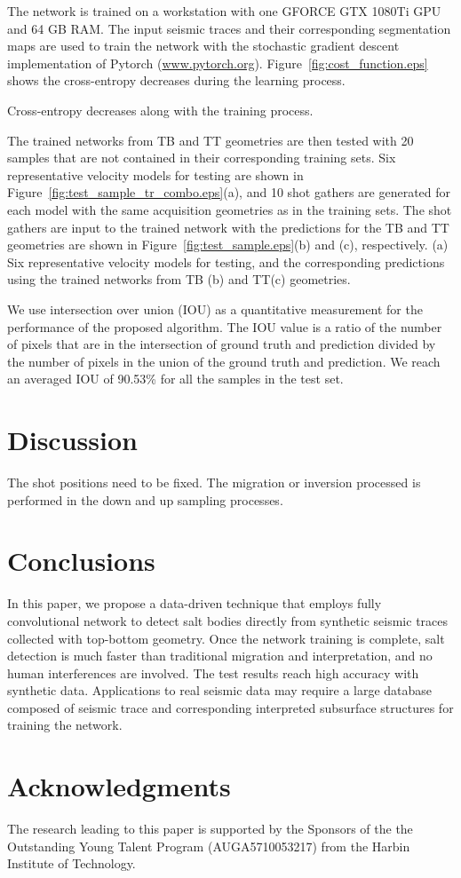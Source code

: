 \documentclass{segabs}
\begin{document}
The network is trained on a workstation with one GFORCE GTX 1080Ti GPU and 64 GB RAM. The input seismic traces and their corresponding segmentation maps are used to train the network with the stochastic gradient descent implementation of Pytorch (\url{www.pytorch.org}). Figure~\ref{fig:cost_function.eps} shows the cross-entropy decreases during the learning process.

{Cross-entropy decreases along with the training process.}

The trained networks from TB and TT geometries are then tested with 20 samples that are not contained in their corresponding training sets. Six representative velocity models for testing are shown in Figure~\ref{fig:test_sample_tr_combo.eps}(a), and 10 shot gathers are generated for each model with the same acquisition geometries as in the training sets. The shot gathers are input to the trained network with the predictions for the TB and TT geometries are shown in Figure~\ref{fig:test_sample.eps}(b) and (c), respectively.
{(a) Six representative velocity models for testing, and the corresponding predictions using the trained networks from TB (b) and TT(c) geometries.}

We use intersection over union (IOU) as a quantitative measurement for the performance of the proposed algorithm. The IOU value is a ratio of the number of pixels that are in the intersection of ground truth and prediction divided by the number of pixels in the union of the ground truth and prediction.
We reach an averaged IOU of 90.53\% for all the samples in the test set.
\section{Discussion}
The shot positions need to be fixed.
The migration or inversion processed is performed in the down and up sampling processes. 


\section{Conclusions}
In this paper, we propose a data-driven technique that employs fully convolutional network to detect salt bodies directly from synthetic seismic traces collected with top-bottom geometry. Once the network training is complete, salt detection is much faster than traditional migration and interpretation, and no human interferences are involved. The test results reach high accuracy with synthetic data. Applications to real seismic data may require a large database composed of seismic trace and corresponding interpreted subsurface structures for training the network.


\section{Acknowledgments}

The research leading to this paper is supported by the Sponsors of the
the Outstanding Young Talent Program (AUGA5710053217) from the Harbin Institute of Technology. 

\newpage


\end{document}

